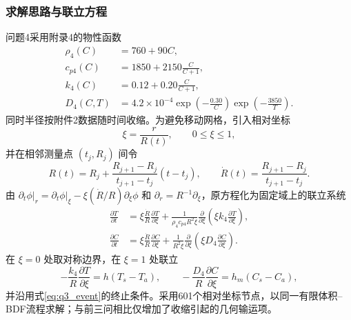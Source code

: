 \documentclass[12pt,a4paper]{ctexart}
\begin{document}
\subsubsection{求解思路与联立方程}
问题4采用附录4的物性函数
\begin{equation}
\begin{aligned}
\rho_4(C)&=760+90C,\\
c_{p4}(C)&=1850+2150\frac{C}{C+1},\\
k_4(C)&=0.12+0.20\frac{C}{C+1},\\
D_4(C,T)&=4.2\times10^{-4}
\exp\!\left(-\frac{0.30}{C}\right)
\exp\!\left(-\frac{3850}{T}\right).
\end{aligned}\label{eq:q4_properties}
\end{equation}
同时半径按附件2数据随时间收缩。为避免移动网格，引入相对坐标
\begin{equation}
\xi=\frac{r}{R(t)},\qquad 0\le\xi\le1,
\end{equation}
并在相邻测量点 $(t_j,R_j)$ 间令
\begin{equation}
R(t)=R_j+\frac{R_{j+1}-R_j}{t_{j+1}-t_j}(t-t_j),\qquad
\dot R(t)=\frac{R_{j+1}-R_j}{t_{j+1}-t_j}.
\end{equation}
由
$\left.\partial_t\phi\right|_r=\left.\partial_t\phi\right|_\xi-
\xi(\dot R/R)\partial_\xi\phi$ 和
$\partial_r=R^{-1}\partial_\xi$，原方程化为固定域上的联立系统
\begin{align}
\frac{\partial T}{\partial t}
&=\xi\frac{\dot R}{R}\frac{\partial T}{\partial\xi}
+\frac{1}{\rho_4c_{p4}R^2\xi}
\frac{\partial}{\partial\xi}\!\left(\xi k_4\frac{\partial T}{\partial\xi}\right),
\label{eq:movingT}\\
\frac{\partial C}{\partial t}
&=\xi\frac{\dot R}{R}\frac{\partial C}{\partial\xi}
+\frac{1}{R^2\xi}
\frac{\partial}{\partial\xi}\!\left(\xi D_4\frac{\partial C}{\partial\xi}\right).
\label{eq:movingC}
\end{align}
在 $\xi=0$ 处取对称边界，在 $\xi=1$ 处联立
\begin{equation}
-\frac{k_4}{R}\frac{\partial T}{\partial\xi}=h(T_s-T_a),\qquad
-\frac{D_4}{R}\frac{\partial C}{\partial\xi}=h_m(C_s-C_a),
\end{equation}
并沿用式\eqref{eq:q3_event}的终止条件。采用601个相对坐标节点，以同一有限体积--BDF流程求解；与前三问相比仅增加了收缩引起的几何输运项。
\end{document}
